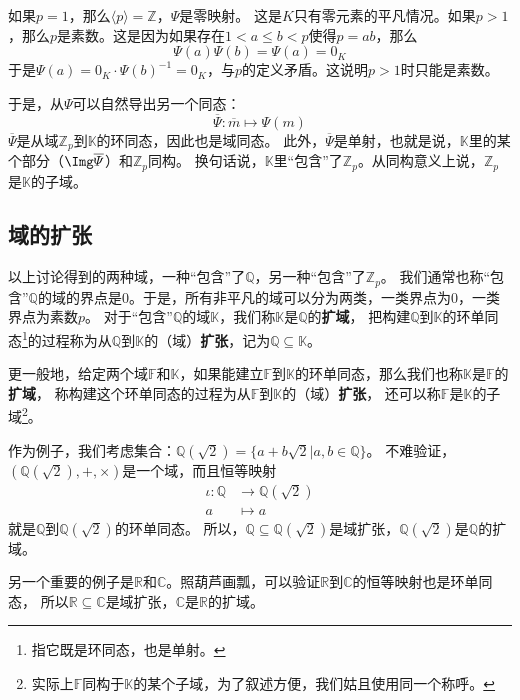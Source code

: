 \documentclass[12pt,UTF8,fontset=none]{ctexbook}
\begin{document}
\begin{appendix}
如果$p=1$，那么$\langle p \rangle = \mathbb{Z}$，$\varPsi$是零映射。
这是$K$只有零元素的平凡情况。如果$p>1$，那么$p$是素数。这是因为如果存在$1 < a \leqslant b < p$使得$p = ab$，那么
$$ \varPsi(a) \varPsi(b) = \varPsi(a) = 0_{K}$$
于是$\varPsi(a) = 0_{K}\cdot \varPsi(b)^{-1} = 0_{K}$，与$p$的定义矛盾。这说明$p>1$时只能是素数。

于是，从$\varPsi$可以自然导出另一个同态：
$$ \overline{\varPsi}: \overline{m} \mapsto \varPsi(m)  $$
$\overline{\varPsi}$是从域$\mathbb{Z}_p$到$\mathbb{K}$的环同态，因此也是域同态。
此外，$\overline{\varPsi}$是单射，也就是说，$\mathbb{K}$里的某个部分（$\Img \overline{\varPsi}$）和$\mathbb{Z}_p$同构。
换句话说，$\mathbb{K}$里“包含”了$\mathbb{Z}_p$。从同构意义上说，$\mathbb{Z}_p$是$\mathbb{K}$的子域。

\subsection{域的扩张}
以上讨论得到的两种域，一种“包含”了$\mathbb{Q}$，另一种“包含”了$\mathbb{Z}_p$。
我们通常也称“包含”$\mathbb{Q}$的域的界点是$0$。于是，所有非平凡的域可以分为两类，一类界点为$0$，一类界点为素数$p$。
对于“包含”$\mathbb{Q}$的域$\mathbb{K}$，我们称$\mathbb{K}$是$\mathbb{Q}$的\textbf{扩域}，
把构建$\mathbb{Q}$到$\mathbb{K}$的环单同态\footnote{指它既是环同态，也是单射。}的过程称为从$\mathbb{Q}$到$\mathbb{K}$的（域）\textbf{扩张}，记为$\mathbb{Q} \subseteq \mathbb{K}$。

更一般地，给定两个域$\mathbb{F}$和$\mathbb{K}$，如果能建立$\mathbb{F}$到$\mathbb{K}$的环单同态，那么我们也称$\mathbb{K}$是$\mathbb{F}$的\textbf{扩域}，
称构建这个环单同态的过程为从$\mathbb{F}$到$\mathbb{K}$的（域）\textbf{扩张}，
还可以称$\mathbb{F}$是$\mathbb{K}$的子域\footnote{实际上$\mathbb{F}$同构于$\mathbb{K}$的某个子域，为了叙述方便，我们姑且使用同一个称呼。}。

作为例子，我们考虑集合：$\mathbb{Q}(\sqrt{2}) = \{a + b\sqrt{2} | a, b \in \mathbb{Q}\}$。
不难验证，$(\mathbb{Q}(\sqrt{2}), +, \times)$是一个域，而且恒等映射
\begin{align*}
    \iota: \mathbb{Q} &\rightarrow \mathbb{Q}(\sqrt{2})  \\
    a &\mapsto a  
\end{align*}
就是$\mathbb{Q}$到$\mathbb{Q}(\sqrt{2})$的环单同态。
所以，$\mathbb{Q} \subseteq \mathbb{Q}(\sqrt{2})$是域扩张，$\mathbb{Q}(\sqrt{2})$是$\mathbb{Q}$的扩域。

另一个重要的例子是$\mathbb{R}$和$\mathbb{C}$。照葫芦画瓢，可以验证$\mathbb{R}$到$\mathbb{C}$的恒等映射也是环单同态，
所以$\mathbb{R} \subseteq \mathbb{C}$是域扩张，$\mathbb{C}$是$\mathbb{R}$的扩域。


\end{appendix}
\end{document}
